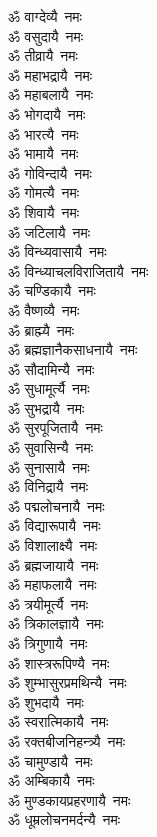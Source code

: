 \begin{multicols}{2}
\begin{flushleft}
ॐ वाग्देव्यै~नमः\\
ॐ वसुदायै~नमः\\
ॐ तीव्रायै~नमः\\
ॐ महाभद्रायै~नमः\\
ॐ महाबलायै~नमः\\
ॐ भोगदायै~नमः\\
ॐ भारत्यै~नमः\\
ॐ भामायै~नमः\\
ॐ गोविन्दायै~नमः\\
ॐ गोमत्यै~नमः\hfill{}\\
ॐ शिवायै~नमः\\
ॐ जटिलायै~नमः\\
ॐ विन्ध्यवासायै~नमः\\
ॐ विन्ध्याचलविराजितायै~नमः\\
ॐ चण्डिकायै~नमः\\
ॐ वैष्णव्यै~नमः\\
ॐ ब्राह्म्यै~नमः\\
ॐ ब्रह्मज्ञानैकसाधनायै~नमः\\
ॐ सौदामिन्यै~नमः\\
ॐ सुधामूर्त्यै~नमः\hfill{}\\
ॐ सुभद्रायै~नमः\\
ॐ सुरपूजितायै~नमः\\
ॐ सुवासिन्यै~नमः\\
ॐ सुनासायै~नमः\\
ॐ विनिद्रायै~नमः\\
ॐ पद्मलोचनायै~नमः\\
ॐ विद्यारूपायै~नमः\\
ॐ विशालाक्ष्यै~नमः\\
ॐ ब्रह्मजायायै~नमः\\
ॐ महाफलायै~नमः\hfill{}\\
ॐ त्रयीमूर्त्यै~नमः\\
ॐ त्रिकालज्ञायै~नमः\\
ॐ त्रिगुणायै~नमः\\
ॐ शास्त्ररूपिण्यै~नमः\\
ॐ शुम्भासुरप्रमथिन्यै~नमः\\
ॐ शुभदायै~नमः\\
ॐ स्वरात्मिकायै~नमः\\
ॐ रक्तबीजनिहन्त्र्यै~नमः\\
ॐ चामुण्डायै~नमः\\
ॐ अम्बिकायै~नमः\hfill{}\\
ॐ मुण्डकायप्रहरणायै~नमः\\
ॐ धूम्रलोचनमर्दन्यै~नमः\\

\end{flushleft}
\end{multicols}
